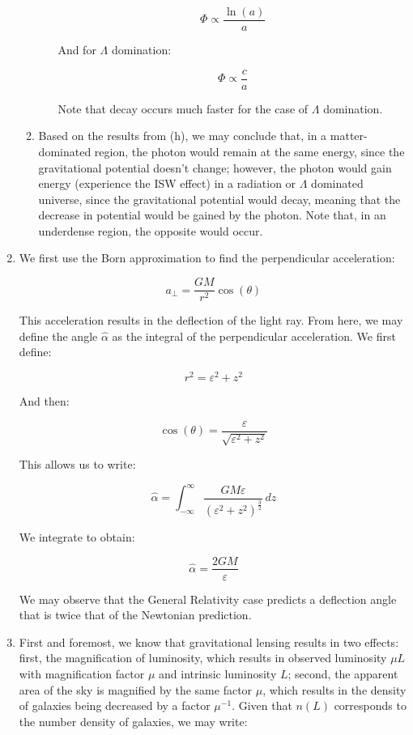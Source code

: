 \begin{enumerate}
\begin{enumerate}
\begin{itemize}
            $$\boxed{\Phi\propto \frac{\ln(a)}{a}}$$

            And for $\Lambda$ domination:

            $$\boxed{\Phi\propto \frac{c}{a}}$$

            Note that decay occurs much faster for the case of $\Lambda$ domination.

        \end{itemize}

      \item Based on the results from (h), we may conclude that, in a matter-dominated region, the photon would remain at the same energy, since the gravitational potential doesn't change; however, the photon would gain energy (experience the ISW effect) in a radiation or $\Lambda$ dominated universe, since the gravitational potential would decay, meaning that the decrease in potential would be gained by the photon. Note that, in an underdense region, the opposite would occur.

    \end{enumerate}

  \item We first use the Born approximation to find the perpendicular acceleration:

    $$a_{\perp}=\frac{GM}{r^2}\cos(\theta)$$

    This acceleration results in the deflection of the light ray. From here, we may define the angle $\hat{\alpha}$ as the integral of the perpendicular acceleration. We first define:

    $$r^2=\varepsilon^2+z^2$$

    And then:

    $$\cos(\theta)=\frac{\varepsilon}{\sqrt{\varepsilon^2+z^2}}$$

    This allows us to write:

    $$\hat{\alpha}=\int_{-\infty}^{\infty} \frac{GM\varepsilon}{(\varepsilon^2+z^2)^{\frac{3}{2}}}\,dz$$

    We integrate to obtain:

    $$\boxed{\hat{\alpha}=\frac{2GM}{\varepsilon}}$$

    We may observe that the General Relativity case predicts a deflection angle that is twice that of the Newtonian prediction.

  \item First and foremost, we know that gravitational lensing results in two effects: first, the magnification of luminosity, which results in observed luminosity $\mu L$ with magnification factor $\mu$ and intrinsic luminosity $L$; second, the apparent area of the sky is magnified by the same factor $\mu$, which results in the density of galaxies being decreased by a factor $\mu^{-1}$. Given that $n(L)$ corresponds to the number density of galaxies, we may write:


\end{enumerate}
